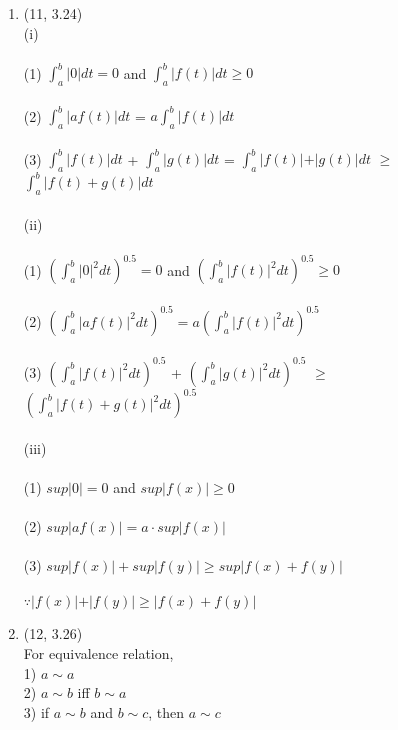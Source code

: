 \documentclass[letterpaper,12pt]{article}
\theoremstyle{definition}
\begin{document}
\begin{enumerate}
	\item (11, 3.24) \\
(i)
\\
\\
(1) $\int_{a}^{b} \vert 0 \vert dt = 0$ and $\int_{a}^{b} \vert f(t) \vert dt \geq 0$
\\
\\
(2) $\int_{a}^{b} \vert af(t) \vert dt$ = $a\int_{a}^{b} \vert f(t) \vert dt$
\\
\\
(3) $\int_{a}^{b} \vert f(t) \vert dt$ + $\int_{a}^{b} \vert g(t) \vert dt$  = $\int_{a}^{b} \vert f(t) \vert + \vert g(t) \vert dt$ $\geq$ $ \int_{a}^{b} \vert f(t) + g(t) \vert dt$
\\
\\
(ii)
\\
\\
(1) $(\int_{a}^{b} \vert 0 \vert ^2 dt)^{0.5} = 0$ and $(\int_{a}^{b} \vert f(t) \vert ^2 dt)^{0.5} \geq 0 $
\\
\\
(2) $(\int_{a}^{b} \vert af(t) \vert^2 dt)^{0.5} = a(\int_{a}^{b} \vert f(t) \vert^2 dt)^{0.5}$
\\
\\
(3) $(\int_{a}^{b} \vert f(t) \vert ^2 dt)^{0.5}$ + $(\int_{a}^{b} \vert g(t) \vert ^2 dt)^{0.5}$ $\geq$ $ (\int_{a}^{b} \vert f(t) + g(t) \vert ^2 dt)^{0.5}$
\\
\\
(iii)
\\
\\
(1) $sup \vert 0 \vert = 0$ and $sup \vert f(x) \vert \geq 0$
\\
\\
(2) $sup \vert af(x) \vert = a \cdot sup \vert f(x) \vert$
\\
\\
(3) $sup \vert f(x) \vert + sup \vert f(y) \vert \geq sup \vert f(x) + f(y) \vert $
\\
\\
$\because \vert f(x) \vert + \vert f(y) \vert \geq \vert f(x) + f(y) \vert $





	\item (12, 3.26) \\ For equivalence relation,\\
			1) $a\sim a$\\
			2) $a\sim b$ iff  $b\sim a$\\
			3) if $a\sim b$ and $b\sim c$, then $a\sim c$ \\ \\


\end{enumerate}
\end{document}
